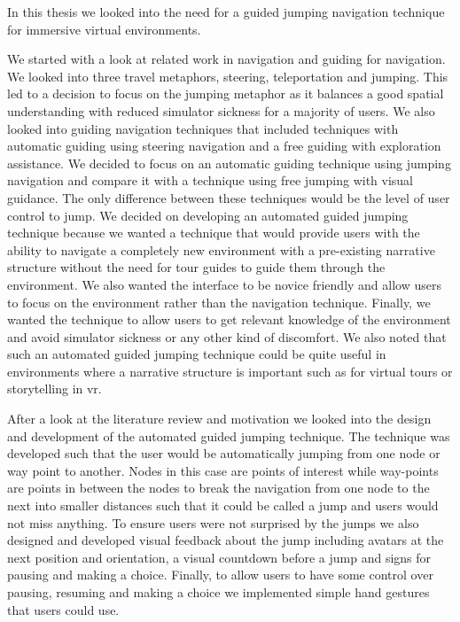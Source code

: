 \label{Chapter:Conclusion and Future Work}
In this thesis we looked into the need for a guided jumping navigation technique for immersive virtual environments.

We started with a look at related work in navigation and guiding for navigation. We looked into three travel metaphors, steering, teleportation and jumping. This led to a decision to focus on the jumping metaphor as it balances a good spatial understanding with reduced simulator sickness for a majority of users. We also looked into guiding navigation techniques that included techniques with automatic guiding using steering navigation and a free guiding with exploration assistance. We decided to focus on an automatic guiding technique using jumping navigation and compare it with a technique using free jumping with visual guidance. The only difference between these techniques would be the level of user control to jump. We decided on developing an automated guided jumping technique because we wanted a technique that would provide users with the ability to navigate a completely new environment with a pre-existing narrative structure without the need for tour guides to guide them through the environment. We also wanted the interface to be novice friendly and allow users to focus on the environment rather than the navigation technique. Finally, we wanted the technique to allow users to get relevant knowledge of the environment and avoid simulator sickness or any other kind of discomfort. We also noted that such an automated guided jumping technique could be quite useful in environments where a narrative structure is important such as for virtual tours or storytelling in \acrshort{vr}.

After a look at the literature review and motivation we looked into the design and development of the automated guided jumping technique. The technique was developed such that the user would be automatically jumping from one node or way point to another. Nodes in this case are points of interest while way-points are points in between the nodes to break the navigation from one node to the next into smaller distances such that it could be called a jump and users would not miss anything. To ensure users were not surprised by the jumps we also designed and developed visual feedback about the jump including avatars at the next position and orientation, a visual countdown before a jump and signs for pausing and making a choice. Finally, to allow users to have some control over pausing, resuming and making a choice we implemented simple hand gestures that users could use.


